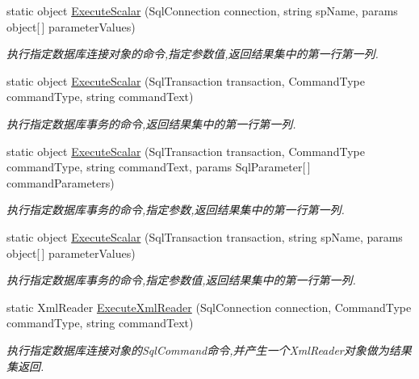 \begin{DoxyCompactItemize}
static object \hyperlink{class_x_c_l_net_tools_1_1_data_base_1_1_m_s_s_q_l_1_1_sql_helper_aaf9f5a292a70fabb52c9bd779b211792}{Execute\+Scalar} (Sql\+Connection connection, string sp\+Name, params object\mbox{[}$\,$\mbox{]} parameter\+Values)
\begin{DoxyCompactList}\small\item\em 执行指定数据库连接对象的命令,指定参数值,返回结果集中的第一行第一列. \end{DoxyCompactList}\item 
static object \hyperlink{class_x_c_l_net_tools_1_1_data_base_1_1_m_s_s_q_l_1_1_sql_helper_ad623943275683a99359e95c24c93340f}{Execute\+Scalar} (Sql\+Transaction transaction, Command\+Type command\+Type, string command\+Text)
\begin{DoxyCompactList}\small\item\em 执行指定数据库事务的命令,返回结果集中的第一行第一列. \end{DoxyCompactList}\item 
static object \hyperlink{class_x_c_l_net_tools_1_1_data_base_1_1_m_s_s_q_l_1_1_sql_helper_a41b41449491a3e6a42e559393c20d66f}{Execute\+Scalar} (Sql\+Transaction transaction, Command\+Type command\+Type, string command\+Text, params Sql\+Parameter\mbox{[}$\,$\mbox{]} command\+Parameters)
\begin{DoxyCompactList}\small\item\em 执行指定数据库事务的命令,指定参数,返回结果集中的第一行第一列. \end{DoxyCompactList}\item 
static object \hyperlink{class_x_c_l_net_tools_1_1_data_base_1_1_m_s_s_q_l_1_1_sql_helper_aaf67292135b2a2ac864a6cae25af8bec}{Execute\+Scalar} (Sql\+Transaction transaction, string sp\+Name, params object\mbox{[}$\,$\mbox{]} parameter\+Values)
\begin{DoxyCompactList}\small\item\em 执行指定数据库事务的命令,指定参数值,返回结果集中的第一行第一列. \end{DoxyCompactList}\item 
static Xml\+Reader \hyperlink{class_x_c_l_net_tools_1_1_data_base_1_1_m_s_s_q_l_1_1_sql_helper_afd575a331f5cff0ec98a3bc4a84e9960}{Execute\+Xml\+Reader} (Sql\+Connection connection, Command\+Type command\+Type, string command\+Text)
\begin{DoxyCompactList}\small\item\em 执行指定数据库连接对象的\+Sql\+Command命令,并产生一个\+Xml\+Reader对象做为结果集返回. \end{DoxyCompactList}\item 

\end{DoxyCompactItemize}
